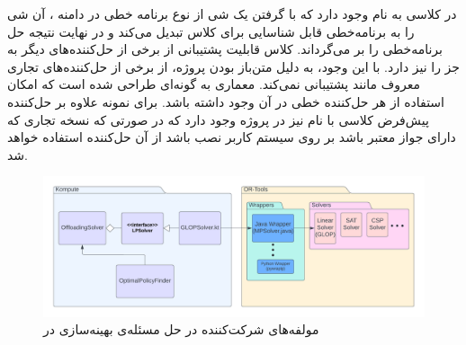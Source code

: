 در  کلاسی به نام  وجود دارد که با گرفتن یک شی از نوع برنامه خطی در دامنه ، آن شی را به برنامه‌خطی قابل شناسایی برای کلاس  تبدیل می‌کند و در نهایت نتیجه حل برنامه‌خطی را بر می‌گرداند. کلاس  قابلیت پشتیبانی از برخی از حل‌کننده‌های دیگر به جز  را نیز دارد. با این وجود، به دلیل متن‌باز بودن پروژه، از برخی از حل‌کننده‌های تجاری معروف مانند  پشتیبانی نمی‌کند. معماری  به گونه‌ای طراحی شده است که امکان استفاده از هر حل‌کننده‌ خطی در آن وجود داشته باشد. برای نمونه علاوه بر حل‌کننده پیش‌فرض  کلاسی با نام  نیز در پروژه وجود دارد که در صورتی که نسخه تجاری  که دارای جواز معتبر باشد بر روی سیستم کاربر نصب باشد از آن حل‌کننده استفاده خواهد شد.
\begin{figure}
	\centering
	\includegraphics[width=\textwidth]{figures/solverdiagram.png}
	\caption{مولفه‌های شرکت‌کننده در حل مسئله‌ی بهینه‌سازی در }
	\label{fig:solverdiagram}
\end{figure}
\newpage
